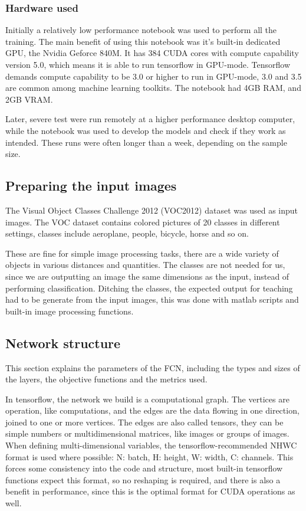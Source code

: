 \documentclass[a4paper,12pt]{article}
\begin{document}
\subsubsection{Hardware used}
Initially a relatively low performance notebook was used to perform all the training. The main benefit of using this notebook was it's built-in dedicated GPU, the Nvidia Geforce 840M. It has 384 CUDA cores with compute capability version 5.0, which means it is able to run tensorflow in GPU-mode. Tensorflow demands compute capability to be 3.0 or higher to run in GPU-mode, 3.0 and 3.5 are common among machine learning toolkits. The notebook had 4GB RAM, and 2GB VRAM.\par
Later, severe test were run remotely at a higher performance desktop computer, while the notebook was used to develop the models and check if they work as intended. These runs were often longer than a week, depending on the sample size.
\subsection{Preparing the input images}
The Visual Object Classes Challenge 2012 (VOC2012) dataset was used as input images. The VOC dataset contains colored pictures of 20 classes in different settings, classes include aeroplane, people, bicycle, horse and so on.\par
These are fine for simple image processing tasks, there are a wide variety of objects in various distances and quantities. The classes are not needed for us, since we are outputting an image the same dimensions as the input, instead of performing classification. Ditching the classes, the expected output for teaching had to be generate from the input images, this was done with matlab scripts and built-in image processing functions.
\subsection{Network structure}
This section explains the parameters of the FCN, including the types and sizes of the layers, the objective functions and the metrics used.\par
In tensorflow, the network we build is a computational graph. The vertices are operation, like computations, and the edges are the data flowing in one direction, joined to one or more vertices. The edges are also called tensors, they can be simple numbers or multidimensional matrices, like images or groups of images.
When defining multi-dimensional variables, the tensorflow-recommended NHWC format is used where possible: N: batch, H: height, W: width, C: channels. This forces some consistency into the code and structure, most built-in tensorflow functions expect this format, so no reshaping is required, and there is also a benefit in performance, since this is the optimal format for CUDA operations as well.
\end{document}
